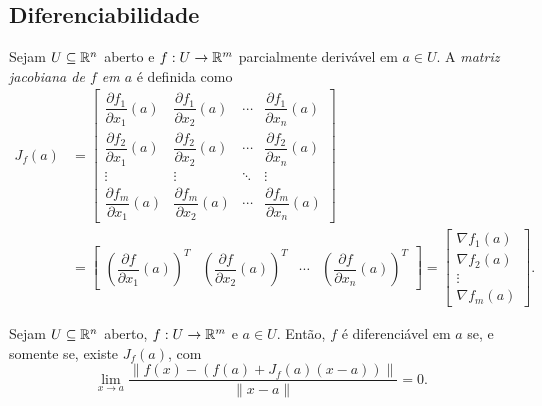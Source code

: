 \subsection{Diferenciabilidade}

\begin{definition}
\end{definition}

\begin{definition}
    Sejam $U \subseteq \mathbb{R}^n$ aberto e $f : U \to \mathbb{R}^m$ parcialmente derivável em $a \in U$. A \emph{matriz jacobiana de $f$ em $a$} é definida como
        \begin{align*}
                J_f(a) &=
                \begin{bmatrix}
                    \dfrac{\partial f_1}{\partial x_1} (a) & \dfrac{\partial f_1}{\partial x_2} (a) & \cdots & \dfrac{\partial f_1}{\partial x_n} (a) \\
                    \dfrac{\partial f_2}{\partial x_1} (a) & \dfrac{\partial f_2}{\partial x_2} (a) & \cdots & \dfrac{\partial f_2}{\partial x_n} (a) \\
                    \vdots & \vdots & \ddots &  \vdots \\
                    \dfrac{\partial f_m}{\partial x_1} (a) & \dfrac{\partial f_m}{\partial x_2} (a) & \cdots & \dfrac{\partial f_m}{\partial x_n} (a)
                \end{bmatrix} \\
                &=
                    \begin{bmatrix}
                        \left( \dfrac{\partial f}{\partial x_1} (a)\right)^T & \left( \dfrac{\partial f}{\partial x_2} (a)\right)^T & \cdots & \left( \dfrac{\partial f}{\partial x_n} (a)\right)^T
                    \end{bmatrix}
                =
                    \begin{bmatrix}
                        \nabla f_1(a) \\
                        \nabla f_2(a) \\
                        \vdots \\
                        \nabla f_m(a)
                    \end{bmatrix}.   
            \end{align*}
\end{definition}

\begin{proposition}
    Sejam $U \subseteq \mathbb{R}^n$ aberto, $f : U \to \mathbb{R}^m$ e $a \in U$. Então, $f$ é diferenciável em $a$ se, e somente se, existe $J_f(a)$, com
        \[
            \lim_{x \to a} \dfrac{\| f(x) - (f(a) + J_f(a)(x-a)) \|}{\|x-a\|} = 0.
        \]
\end{proposition}

